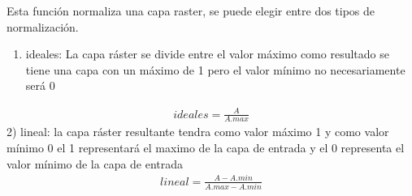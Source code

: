 \documentclass[letterpaper,10pt,spanish]{sphinxmanual}
\begin{document}

\begin{fulllineitems}
\label{\detokenize{apcsig:apcsig.normailiza}}
Esta función normaliza una capa raster, se puede elegir entre dos tipos de normalización.
\begin{enumerate}
\def\theenumi{\arabic{enumi}}
\def\labelenumi{\theenumi )}
\makeatletter\def\p@enumii{\p@enumi \theenumi )}\makeatother
\item {} 
ideales: La capa ráster se divide entre el valor máximo como resultado se tiene una capa con un máximo de 1 pero el valor mínimo no necesariamente será 0

\end{enumerate}
\begin{equation*}
\begin{split}ideales=\frac{A}{A.max}\end{split}
\end{equation*}
2) lineal: la capa ráster resultante tendra como valor máximo 1 y como valor mínimo 0
el 1 representará el maximo de la capa de entrada y el 0 representa el valor mínimo de la 
capa de entrada
\begin{equation*}
\begin{split}lineal=\frac{A -A.min}{A.max - A.min}\end{split}
\end{equation*}
\end{fulllineitems}

\end{document}
